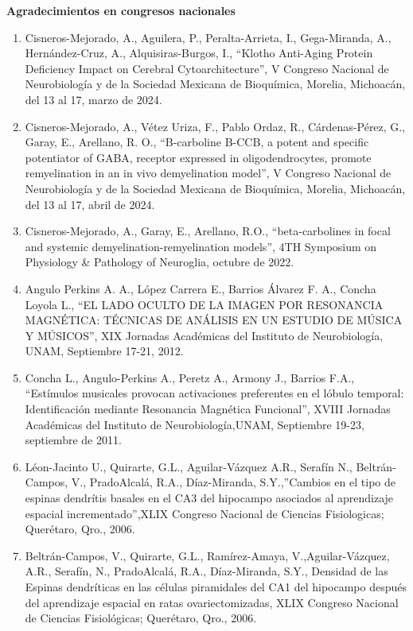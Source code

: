 \textbf{Agradecimientos en congresos nacionales}

\begin{enumerate}

\item Cisneros-Mejorado, A., Aguilera, P., Peralta-Arrieta, I., Gega-Miranda, A., Hernández-Cruz, A., Alquisiras-Burgos, I., “Klotho 
Anti-Aging 
Protein Deficiency Impact on Cerebral Cytoarchitecture”, V Congreso Nacional de Neurobiología y de la Sociedad Mexicana de Bioquímica, 
Morelia, Michoacán, del 13 al 17, marzo de 2024.

\item Cisneros-Mejorado, A., Vétez Uriza, F., Pablo Ordaz, R., Cárdenas-Pérez, G., Garay, E., Arellano, R. O., “B-carboline B-CCB, a potent 
and 
specific potentiator of GABA, receptor expressed in oligodendrocytes, promote remyelination in an in vivo demyelination model”, V Congreso 
Nacional de Neurobiología y de la Sociedad Mexicana de Bioquímica, Morelia, Michoacán, del 13 al 17, abril de 2024.

\item Cisneros-Mejorado, A., Garay, E., Arellano, R.O., “beta-carbolines in focal and systemic demyelination-remyelination models”, 4TH 
Symposium 
on Physiology \& Pathology of Neuroglia, octubre de 2022.

\item Angulo Perkins A. A., López Carrera E., Barrios Álvarez F. A., Concha Loyola L., “EL LADO OCULTO DE LA IMAGEN POR RESONANCIA MAGNÉTICA: 
TÉCNICAS DE ANÁLISIS EN UN ESTUDIO DE MÚSICA Y MÚSICOS”, XIX Jornadas Académicas del Instituto de Neurobiología, UNAM, Septiembre 17-21, 
2012.

\item Concha L., Angulo-Perkins A., Peretz A., Armony J., Barrios F.A., “Estímulos musicales provocan activaciones preferentes en el lóbulo 
temporal: Identificación mediante Resonancia Magnética Funcional”, XVIII Jornadas Académicas del Instituto de Neurobiología,UNAM, Septiembre 
19-23, septiembre de 2011.

\item Léon-Jacinto U., Quirarte, G.L., Aguilar-Vázquez A.R., Serafín N., Beltrán-Campos, V., PradoAlcalá, R.A., Díaz-Miranda, S.Y.,”Cambios 
en el 
tipo de espinas dendrítis basales en el CA3 del hipocampo asociados al aprendizaje espacial incrementado”,XLIX Congreso Nacional de Ciencias 
Fisiologicas; Querétaro, Qro., 2006.

\item Beltrán-Campos, V., Quirarte, G.L., Ramírez-Amaya, V.,Aguilar-Vázquez, A.R., Serafín, N., PradoAlcalá, R.A., Díaz-Miranda, S.Y., 
Densidad de 
las Espinas dendríticas en las células piramidales del CA1 del hipocampo después del aprendizaje espacial en ratas ovariectomizadas, XLIX 
Congreso Nacional de Ciencias Fisiológicas; Querétaro, Qro., 2006.


\end{enumerate}
